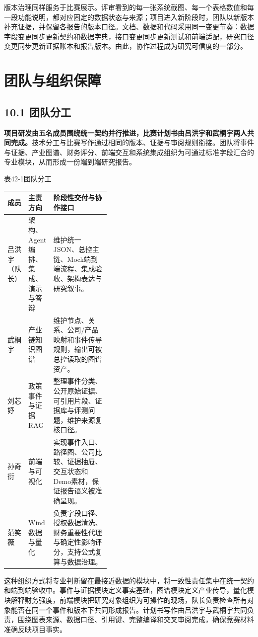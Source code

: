 版本治理同样服务于比赛展示。评审看到的每一张系统截图、每一个表格数值和每一段功能说明，都对应固定的数据状态与来源；项目进入新阶段时，团队以新版本补充证据，并保留各报告的版本口径。文档、数据和代码采用同一变更节奏：数据字段变更同步更新契约和数据字典，接口变更同步更新测试和前端适配，研究口径变更同步更新证据账本和报告版本。由此，协作过程成为研究可信度的一部分。


\section{团队与组织保障}
\subsection*{10.1 团队分工}\label{page:42}
\noindent\textbf{项目研发由五名成员围绕统一契约并行推进，比赛计划书由吕洪宇和武桐宇两人共同完成。}技术分工与比赛写作通过相同的版本、证据与审阅规则衔接。团队将事件与证据、产业图谱、财务评分、前端交互和系统集成组织为可通过标准字段汇合的专业模块，从而形成一份端到端研究报告\cite{lhy-team}。

\begin{center}\small 表42-1\quad 团队分工\par\vspace{1mm}
\begin{tabularx}{\linewidth}{p{0.17\linewidth}p{0.24\linewidth}X}
\toprule
成员 & 主责方向 & 阶段性交付与协作接口\\
\midrule
吕洪宇（队长） & 架构、Agent编排、集成、演示与答辩 & 维护统一JSON、总控主链、Mock端到端流程、集成验收、架构表达与研究叙事。\\
武桐宇 & 产业链知识图谱 & 维护节点、关系、公司/产品映射和事件传导规则，输出可被总控读取的图谱资产。\\
刘芯妤 & 政策事件与证据RAG & 整理事件分类、公开原始证据、可引用片段、证据库与评测问题，维护来源复核口径。\\
孙奇衍 & 前端与可视化 & 实现事件入口、路径图、公司比较、证据抽屉、交互状态和Demo素材，保证报告语义被准确呈现。\\
范笑薇 & Wind数据与量化 & 负责字段口径、授权数据清洗、财务重要性代理与确定性影响评分，支持公式复算与数据治理。\\
\bottomrule
\end{tabularx}\end{center}

这种组织方式将专业判断留在最接近数据的模块中，将一致性责任集中在统一契约和端到端验收中。事件与证据模块定义事实基础，图谱模块定义产业传导，量化模块解释财务强度，前端模块把研究对象组织为可操作的现场，队长负责检查所有对象能否在同一个事件和版本下共同形成报告。计划书写作由吕洪宇与武桐宇共同负责，围绕图表来源、数据口径、引用键、完整编译和交叉审阅完成，确保竞赛材料准确反映项目事实。

